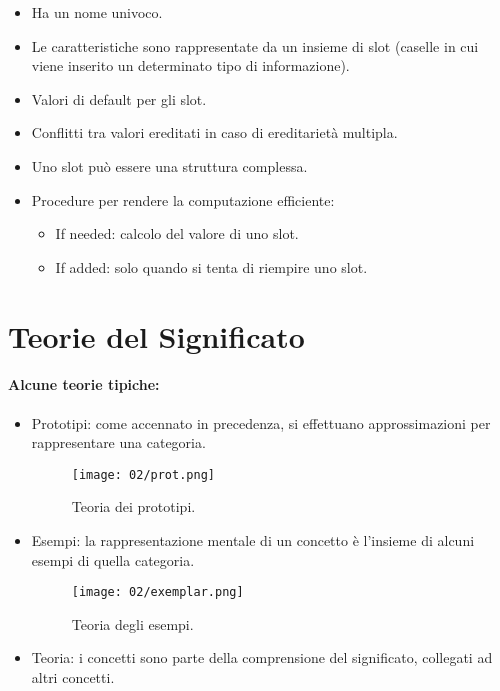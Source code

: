 
\begin{itemize}
  \item Ha un nome univoco. 
  \item Le caratteristiche sono rappresentate da un insieme di slot (caselle in cui viene inserito un determinato tipo di informazione). 
  \item Valori di default per gli slot. 
  \item Conflitti tra valori ereditati in caso di ereditarietà multipla. 
  \item Uno slot può essere una struttura complessa. 
  \item Procedure per rendere la computazione efficiente: 
    \begin{itemize}
      \item If needed: calcolo del valore di uno slot. 
      \item If added: solo quando si tenta di riempire uno slot.
    \end{itemize}
\end{itemize}

\section{Teorie del Significato}

\paragraph{Alcune teorie tipiche:}

\begin{itemize}
  \item Prototipi: come accennato in precedenza, si effettuano approssimazioni per rappresentare una categoria. 
\begin{figure}[h]
    \centering
    \texttt{[image: 02/prot.png]}
    \caption{Teoria dei prototipi.}
\end{figure}

  \item Esempi: la rappresentazione mentale di un concetto è l'insieme di alcuni esempi di quella categoria.
    \begin{figure}[h]
    \centering
    \texttt{[image: 02/exemplar.png]}
    \caption{Teoria degli esempi.}
\end{figure}
  \item Teoria: i concetti sono parte della comprensione del significato, collegati ad altri concetti.
\end{itemize}

